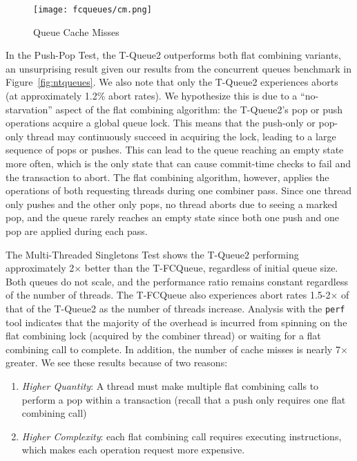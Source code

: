 \begin{figure}[ht!]
\caption{Queue Cache Misses}
    \centering
    \texttt{[image: fcqueues/cm.png]}
\label{fig:cm_queues}
\end{figure}

In the Push-Pop Test, the T-Queue2 outperforms both flat combining variants, an unsurprising result given our results from the concurrent queues benchmark in Figure~\ref{fig:ntqueues}. We also note that only the T-Queue2 experiences aborts (at approximately 1.2\% abort rates). We hypothesize this is due to a ``no-starvation'' aspect of the flat combining algorithm: the T-Queue2's pop or push operations acquire a global queue lock. This means that the push-only or pop-only thread may continuously succeed in acquiring the lock, leading to a large sequence of pops or pushes. This can lead to the queue reaching an empty state more often, which is the only state that can cause commit-time checks to fail and the transaction to abort. The flat combining algorithm, however, applies the operations of both requesting threads during one combiner pass. Since one thread only pushes and the other only pops, no thread aborts due to seeing a marked pop, and the queue rarely reaches an empty state since both one push and one pop are applied during each pass.

The Multi-Threaded Singletons Test shows the T-Queue2 performing approximately 2$\times$ better than the T-FCQueue, regardless of initial queue size. Both queues do not scale, and the performance ratio remains constant regardless of the number of threads. The T-FCQueue also experiences abort rates 1.5-2$\times$ of that of the T-Queue2 as the number of threads increase.
Analysis with the \texttt{perf} tool indicates that the majority of the overhead is incurred from spinning on the flat combining lock (acquired by the combiner thread) or waiting for a flat combining call to complete. In addition, the number of cache misses is nearly 7$\times$ greater. We see these results because of two reasons:
\begin{enumerate}
\item \emph{Higher Quantity}: A thread must make multiple flat combining calls to perform a pop within a transaction (recall that a push only requires one flat combining call) 
\item \emph{Higher Complexity}: each flat combining call requires executing instructions, which makes each operation request more expensive.
\end{enumerate}

